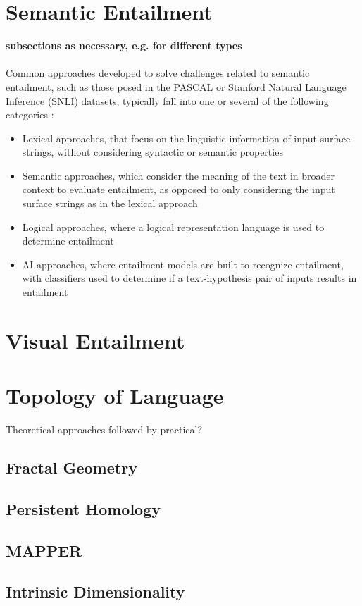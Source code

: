 \documentclass[12pt,twoside]{report}
\begin{document}
\section{Semantic Entailment}
\textbf{subsections as necessary, e.g. for different types}
\\
\\
Common approaches developed to solve challenges related to semantic entailment, such as those posed in the PASCAL \cite{dagan2006} or Stanford Natural Language Inference (SNLI) \cite{bowman2015} datasets, typically fall into one or several of the following categories \cite{PARAMASIVAM20229644}:
\begin{itemize}
    \item Lexical approaches, that focus on the linguistic information of input surface strings, without considering syntactic or semantic properties
    \item Semantic approaches, which consider the meaning of the text in broader context to evaluate entailment, as opposed to only considering the input surface strings as in the lexical approach
    \item Logical approaches, where a logical representation language is used to determine entailment
    \item AI approaches, where entailment models are built to recognize entailment, with classifiers used to determine if a text-hypothesis pair of inputs results in entailment 
\end{itemize}


\section{Visual Entailment}
\section{Topology of Language}
Theoretical approaches followed by  practical?
\subsection{Fractal Geometry}
\subsection{Persistent Homology}
\subsection{MAPPER}
\subsection{Intrinsic Dimensionality}
\end{document}

